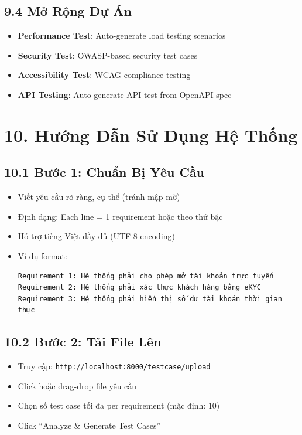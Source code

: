 \documentclass[14pt,a4paper]{article}
\begin{document}
\subsection{9.4 Mở Rộng Dự Án}

\begin{itemize}
    \item \textbf{Performance Test}: Auto-generate load testing scenarios
    \item \textbf{Security Test}: OWASP-based security test cases
    \item \textbf{Accessibility Test}: WCAG compliance testing
    \item \textbf{API Testing}: Auto-generate API test from OpenAPI spec
\end{itemize}

\section{10. Hướng Dẫn Sử Dụng Hệ Thống}

\subsection{10.1 Bước 1: Chuẩn Bị Yêu Cầu}

\begin{itemize}
    \item Viết yêu cầu rõ ràng, cụ thể (tránh mập mờ)
    \item Định dạng: Each line = 1 requirement hoặc theo thứ bậc
    \item Hỗ trợ tiếng Việt đầy đủ (UTF-8 encoding)
    \item Ví dụ format:
    \begin{verbatim}
Requirement 1: Hệ thống phải cho phép mở tài khoản trực tuyến
Requirement 2: Hệ thống phải xác thực khách hàng bằng eKYC
Requirement 3: Hệ thống phải hiển thị số dư tài khoản thời gian thực
    \end{verbatim}
\end{itemize}

\subsection{10.2 Bước 2: Tải File Lên}

\begin{itemize}
    \item Truy cập: \texttt{http://localhost:8000/testcase/upload}
    \item Click hoặc drag-drop file yêu cầu
    \item Chọn số test case tối đa per requirement (mặc định: 10)
    \item Click ``Analyze \& Generate Test Cases''
\end{itemize}
\end{document}
